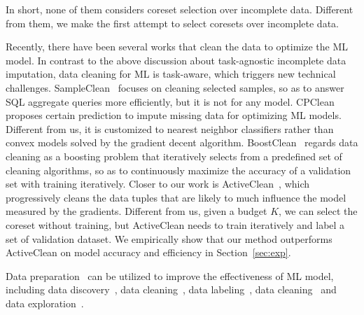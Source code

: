 In short, none of them considers coreset selection over incomplete data. Different from them, we make the first attempt to select coresets over incomplete data.

 Recently, there have  been several works that clean the data to optimize the ML model. 
In contrast to the above discussion about task-agnostic incomplete data imputation, data cleaning for ML is task-aware, which triggers new technical challenges.
SampleClean~\cite{DBLP:journals/debu/KrishnanWFGKM015} focuses on cleaning selected samples, so as to answer  SQL aggregate  queries  more efficiently, but it is not for any model.
%
 CPClean~\cite{DBLP:journals/pvldb/KarlasLWGC0020} proposes certain prediction to impute missing data for optimizing ML models. Different from us, it is customized to nearest neighbor classifiers rather than convex models solved by the gradient decent algorithm. 
  BoostClean~\cite{DBLP:journals/corr/abs-1711-01299} regards data cleaning as a boosting problem that iteratively
 selects from a predefined set of cleaning algorithms, so as to continuously maximize the accuracy of  a validation set with training iteratively. 
Closer to our work is ActiveClean~\cite{DBLP:journals/pvldb/KrishnanWWFG16}, which progressively cleans the data tuples that are likely to much influence the model   measured by the gradients. 
Different from us,  given a budget $K$, we can select the coreset without training, but ActiveClean needs to train iteratively  and label a set of   validation  dataset.  We empirically show that our method outperforms ActiveClean on model accuracy and efficiency in Section~\ref{sec:exp}.



Data preparation~\cite{chai2020crowdchart} can be utilized to improve the effectiveness of ML model, including data discovery~\cite{liu2021automatic, chai2022selective, liu2022feature},  data cleaning~\cite{hao2020outdated,chai2020human}, data labeling~\cite{chai2016cost, chai2018partial, li2018cdb}, data cleaning~\cite{miao2022experimental, gao2018query,miao2018incomplete, miao2021efficient,wu2022interactive,ge2020hybrid} and data exploration~\cite{qin2020interactively,qin2021ranking}.